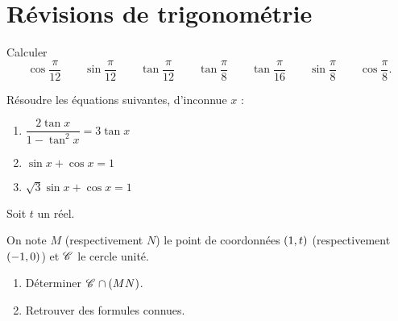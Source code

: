 \chapter{Révisions de trigonométrie}

\minitoc

\begin{exo}
Calculer \[\cos\dfrac{\pi}{12}\qquad\sin\dfrac{\pi}{12}\qquad\tan\dfrac{\pi}{12}\qquad\tan\dfrac{\pi}{8}\qquad\tan\dfrac{\pi}{16}\qquad\sin\dfrac{\pi}{8}\qquad\cos\dfrac{\pi}{8}.\]
\end{exo}

\begin{corr}
\end{corr}

\begin{exo}
Résoudre les équations suivantes, d'inconnue \(x\) :

\begin{enumerate}
\item \(\dfrac{2\tan x}{1-\tan^2x}=3\tan x\) \\

\item \(\sin x+\cos x=1\) \\

\item \(\sqrt{3}\sin x+\cos x=1\)
\end{enumerate}
\end{exo}

\begin{corr}
\end{corr}

\begin{exo}
Soit \(t\) un réel.

On note \(M\) (respectivement \(N\)) le point de coordonnées \(\left(1,t\right)\) (respectivement \(\left(-1,0\right)\)) et \(\mathscr{C}^{}\) le cercle unité.

\begin{enumerate}
\item Déterminer \(\mathscr{C}^{}\cap\left(MN\right)\). \\

\item Retrouver des formules connues.
\end{enumerate}
\end{exo}

\begin{corr}
\end{corr}

